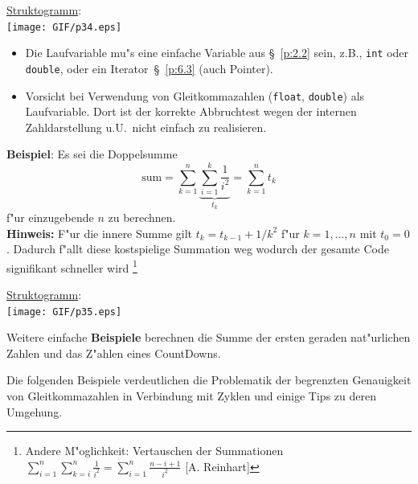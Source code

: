 \underline{Struktogramm}: \\
\texttt{[image: GIF/p34.eps]}
%
\begin{itemize}
 \item Die Laufvariable mu"s eine einfache Variable aus \S~\ref{p:2.2}
 	sein, z.B., \verb|int| oder \verb|double|,
	oder ein Iterator~\S~\ref{p:6.3} (auch Pointer).
 \item Vorsicht bei Verwendung von Gleitkommazahlen
 (\verb|float|, \verb|double|) als
 Laufvariable.
 Dort ist der korrekte Abbruchtest wegen der internen Zahldarstellung
 u.U.\  nicht einfach zu realisieren.
\end{itemize}


\begin{minipage}[c]{0.4\textwidth}
\textbf{Beispiel}:
Es sei die Doppelsumme
$$
  \text{sum} = \sum_{k=1}^n \underbrace{\sum_{i=1}^k \frac{1}{i^2}}_{t_k}
  =  \sum_{k=1}^n t_k
$$
f"ur einzugebende $n$ zu berechnen.\\
\textbf{Hinweis:} F"ur die innere Summe gilt $t_k = t_{k-1}+1/k^2$
f"ur $k=1,\ldots,n$ mit $t_0 = 0$. Dadurch f"allt diese kostspielige
Summation weg wodurch der gesamte Code signifikant schneller wird
\footnote{Andere M"oglichkeit:
Vertauschen der Summationen $\sum_{i=1}^n \sum_{k=i}^n \frac{1}{i^2}
 =  \sum_{i=1}^n  \frac{n-i+1}{i^2}$ [A. Reinhart]}
\end{minipage}
%
%
%
%
%
\hfill
\begin{minipage}{0.5\textwidth}
\underline{Struktogramm}: \\
%
\texttt{[image: GIF/p35.eps]}
\end{minipage}
%
%

Weitere einfache \textbf{Beispiele} berechnen die Summe der
ersten geraden nat"urlichen Zahlen
und das Z"ahlen eines CountDowns.

%
%
Die folgenden Beispiele verdeutlichen die Problematik der
begrenzten Genauigkeit von Gleitkommazahlen in Verbindung
mit Zyklen und einige Tips zu deren Umgehung.

